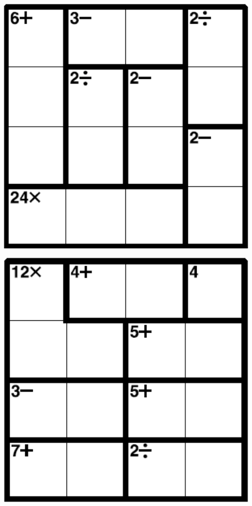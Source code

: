 
\includegraphics[scale=1]{Gambar/Lampiran/4x4_15.png}

\includegraphics[scale=1]{Gambar/Lampiran/4x4_16.png}
